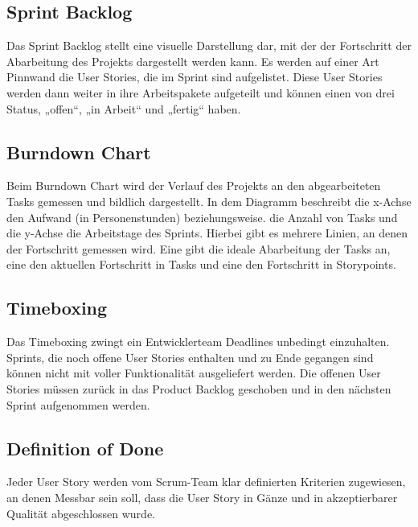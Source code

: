 \subsection{Sprint Backlog}
Das Sprint Backlog stellt eine visuelle Darstellung dar, mit der der Fortschritt der Abarbeitung des Projekts dargestellt werden kann. Es werden auf einer Art Pinnwand die User Stories, die im Sprint sind aufgelistet. Diese User Stories werden dann weiter in ihre Arbeitspakete aufgeteilt und können einen von drei Status, „offen“, „in Arbeit“ und „fertig“ haben.
\subsection{Burndown Chart}
Beim Burndown Chart wird der Verlauf des Projekts an den abgearbeiteten Tasks gemessen und bildlich dargestellt. In dem Diagramm beschreibt die x-Achse den Aufwand (in Personenstunden) beziehungsweise. die Anzahl von Tasks und die y-Achse die Arbeitstage des Sprints. 
Hierbei gibt es mehrere Linien, an denen der Fortschritt gemessen wird. Eine gibt die ideale Abarbeitung der Tasks an, eine den aktuellen Fortschritt in Tasks und eine den Fortschritt in Storypoints.
\newpage
\subsection{Timeboxing}
Das Timeboxing zwingt ein Entwicklerteam Deadlines unbedingt einzuhalten. Sprints, die noch offene User Stories enthalten und zu Ende gegangen sind können nicht mit voller Funktionalität ausgeliefert werden. Die offenen User Stories müssen zurück in das Product Backlog geschoben und in den nächsten Sprint aufgenommen werden.
\subsection{Definition of Done}
Jeder User Story werden vom Scrum-Team klar definierten Kriterien zugewiesen, an denen Messbar sein soll, dass die User Story in Gänze und in akzeptierbarer Qualität abgeschlossen wurde.
